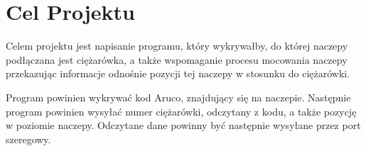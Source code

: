 \section{Cel Projektu}

Celem projektu jest napisanie programu, który wykrywałby, do której naczepy podłączana jest
ciężarówka, a także wspomaganie procesu mocowania naczepy przekazując informacje odnośnie pozycji
tej naczepy w stosunku do ciężarówki.

Program powinien wykrywać kod Aruco, znajdujący się na naczepie. Następnie program powinien wysyłać
numer ciężarówki, odczytany z kodu, a także pozycję w poziomie naczepy. Odczytane dane powinny być
następnie wysyłane przez port szeregowy.

